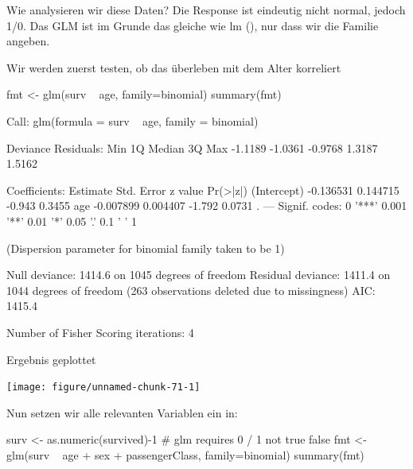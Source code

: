 \documentclass[a4paper,twoside]{tufte-book}\usepackage[]{graphicx}\usepackage[]{color}
\begin{document}
\begin{appendices}
Wie analysieren wir diese Daten? Die Response ist eindeutig nicht normal, jedoch 1/0. Das GLM ist im Grunde das gleiche wie lm (), nur dass wir die Familie angeben.

Wir werden zuerst testen, ob das überleben mit dem Alter korreliert

\begin{Schunk}
\begin{Sinput}
fmt <- glm(surv ~ age, family=binomial)
summary(fmt)
\end{Sinput}
\begin{Soutput}

Call:
glm(formula = surv ~ age, family = binomial)

Deviance Residuals: 
    Min       1Q   Median       3Q      Max  
-1.1189  -1.0361  -0.9768   1.3187   1.5162  

Coefficients:
             Estimate Std. Error z value Pr(>|z|)  
(Intercept) -0.136531   0.144715  -0.943   0.3455  
age         -0.007899   0.004407  -1.792   0.0731 .
---
Signif. codes:  0 '***' 0.001 '**' 0.01 '*' 0.05 '.' 0.1 ' ' 1

(Dispersion parameter for binomial family taken to be 1)

    Null deviance: 1414.6  on 1045  degrees of freedom
Residual deviance: 1411.4  on 1044  degrees of freedom
  (263 observations deleted due to missingness)
AIC: 1415.4

Number of Fisher Scoring iterations: 4
\end{Soutput}
\end{Schunk}

Ergebnis geplottet

\begin{Schunk}

\texttt{[image: figure/unnamed-chunk-71-1]} \end{Schunk}


Nun setzen wir alle relevanten Variablen ein in:

\begin{Schunk}
\begin{Sinput}
surv <- as.numeric(survived)-1 # glm requires 0 / 1 not true false
fmt <- glm(surv ~ age  + sex + passengerClass, family=binomial)
summary(fmt)
\end{Sinput}
\begin{Soutput}


\end{Soutput}
\end{Schunk}
\end{appendices}
\end{document}

